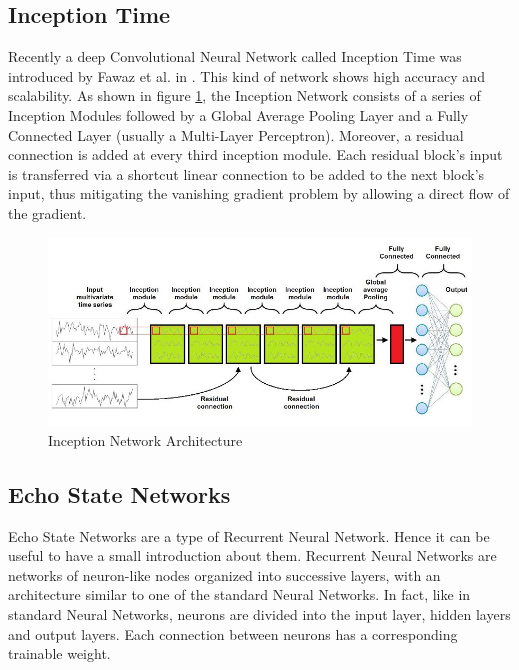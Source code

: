 \subsection{Inception Time}
Recently a deep Convolutional Neural Network called Inception Time was introduced by Fawaz et al. in \cite{IsmailFawaz2020InceptionTime:Classification}. This kind of network shows high accuracy and scalability. As shown in figure \ref{fig:a2}, the Inception Network consists of a series of Inception Modules followed by a Global Average Pooling Layer and a Fully Connected Layer (usually a Multi-Layer Perceptron). Moreover, a residual connection is added at every third inception module. Each residual block’s input is transferred via a shortcut linear connection to be added to the next block’s input, thus mitigating the vanishing gradient problem by allowing a direct flow of the gradient.

\begin{figure}[H]
    \centering
    \begin{minipage}[b]{\textwidth}
        \includegraphics[width=\textwidth]{manuscript/src/figures/project/app2.jpeg}
    \end{minipage}
    \caption{Inception Network Architecture \cite{IsmailFawaz2020InceptionTime:Classification}}
    \label{fig:a2}
\end{figure}


\subsection{Echo State Networks}

Echo State Networks \cite{Bianchi2018ReservoirSeries} are a type of Recurrent Neural Network. Hence it can be useful to have a small introduction about them. Recurrent Neural Networks are networks of neuron-like nodes organized into successive layers, with an architecture similar to one of the standard Neural Networks. In fact, like in standard Neural Networks, neurons are divided into the input layer, hidden layers and output layers. Each connection between neurons has a corresponding trainable weight.  

